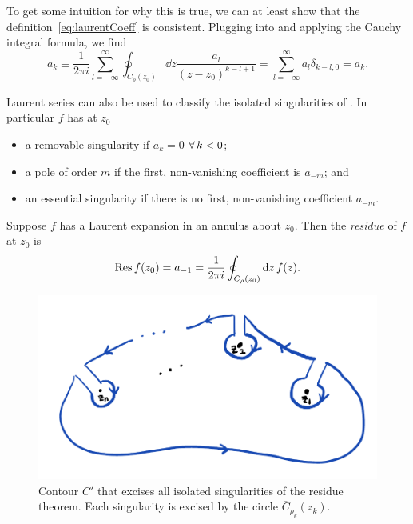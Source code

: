 To get some intuition for why this is true, we can at least show that the
definition~\eqref{eq:laurentCoeff} is consistent.
Plugging  into 
and applying the Cauchy integral formula, we find
\begin{equation}
  a_k\equiv\frac{1}{2\pi i}\sum_{l=-\infty}^\infty\oint_{C_{\rho}(z_0)}
  \dd{z}\frac{a_l}{(z-z_0)^{k-l+1}}
     = \sum_{l=-\infty}^\infty a_l\delta_{k-l,0}=a_k.
\end{equation}

Laurent series can also be used to classify the isolated singularities
of . In particular $f$ has at $z_0$
\begin{itemize}
  \item a removable singularity if $a_k=0$ $\operatorname{\forall} k<0$;
  \item a pole of order $m$ if the first, non-vanishing coefficient
        is $a_{-m}$; and
  \item an essential singularity if there is no first, non-vanishing
        coefficient $a_{-m}$.
\end{itemize}

Suppose $f$ has a Laurent expansion in an annulus about $z_0$.
Then the {\it residue} of $f$ at $z_0$ is
\begin{equation}
 \Res f(z_0)=a_{-1}=\frac{1}{2\pi i}\oint_{C_{\rho}(z_0)}\dd{z}f(z).
\end{equation}

\begin{figure}
\includegraphics[width=\linewidth]{figs/residue_theorem-cropped.pdf}
\caption{Contour $C'$ that excises all isolated singularities of
the residue theorem. Each singularity is excised by the circle
$\overline{C}_{\rho_k}(z_k)$.}
\label{fig:residue}
\end{figure}

